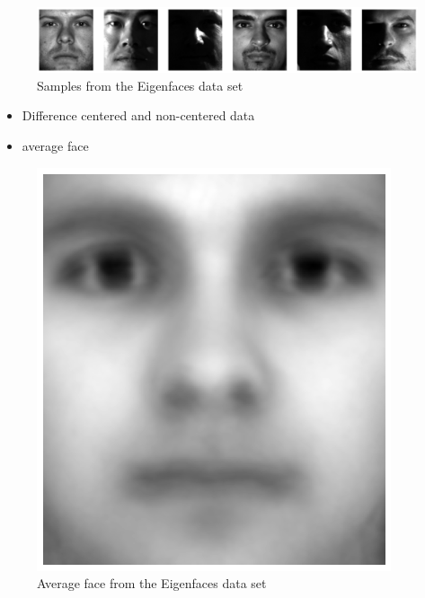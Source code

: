 \begin{center}
    \begin{figure}[h]
      \centering
      \includegraphics[width=0.94\linewidth]{external_content/media/eigenfaces.png}
      \captionsetup{justification=centering}
      \caption{Samples from the Eigenfaces data set \cite{georghiades2001few}}
      \label{fig:eigenfaces}
    \end{figure}
\end{center}

\begin{itemize}
  \item Difference centered and non-centered data
  \item average face
\end{itemize}

\begin{center}
    \begin{figure}[h]
      \centering
      \includegraphics[width=0.5\linewidth]{external_content/media/eigenfaces/average_face.png}
      \captionsetup{justification=centering}
      \caption{Average face from the Eigenfaces data set}
      \label{fig:eigenfacesAVGface}
    \end{figure}
\end{center}

